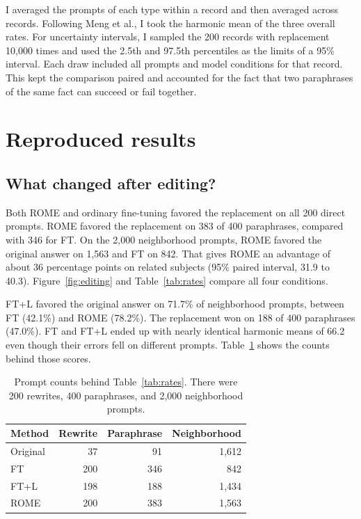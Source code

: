 \documentclass[11pt]{article}
\begin{document}
I averaged the prompts of each type within a record and then averaged across records. Following Meng et al., I took the harmonic mean of the three overall rates. For uncertainty intervals, I sampled the 200 records with replacement 10,000 times and used the 2.5th and 97.5th percentiles as the limits of a 95\% interval. Each draw included all prompts and model conditions for that record. This kept the comparison paired and accounted for the fact that two paraphrases of the same fact can succeed or fail together.

\section{Reproduced results}
\subsection{What changed after editing?}

Both ROME and ordinary fine-tuning favored the replacement on all 200 direct prompts. ROME favored the replacement on 383 of 400 paraphrases, compared with 346 for FT. On the 2,000 neighborhood prompts, ROME favored the original answer on 1,563 and FT on 842. That gives ROME an advantage of about 36 percentage points on related subjects (95\% paired interval, 31.9 to 40.3). Figure~\ref{fig:editing} and Table~\ref{tab:rates} compare all four conditions.

FT+L favored the original answer on 71.7\% of neighborhood prompts, between FT (42.1\%) and ROME (78.2\%). The replacement won on 188 of 400 paraphrases (47.0\%). FT and FT+L ended up with nearly identical harmonic means of 66.2 even though their errors fell on different prompts. Table~\ref{tab:counts} shows the counts behind those scores.
\begin{table}[t]\centering\small
\begin{tabular}{@{}lrrr@{}}\toprule
Method & Rewrite & Paraphrase & Neighborhood \\\midrule
Original & 37 & 91 & 1,612 \\
FT & 200 & 346 & 842 \\
FT+L & 198 & 188 & 1,434 \\
ROME & 200 & 383 & 1,563 \\\bottomrule
\end{tabular}
\caption{Prompt counts behind Table~\ref{tab:rates}. There were 200 rewrites, 400 paraphrases, and 2,000 neighborhood prompts.}\label{tab:counts}
\end{table}
\end{document}
